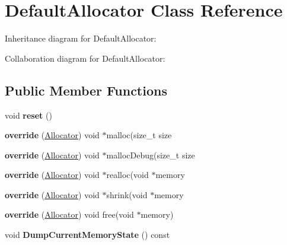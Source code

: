 \hypertarget{class_default_allocator}{\section{Default\+Allocator Class Reference}
\label{class_default_allocator}
}


Inheritance diagram for Default\+Allocator\+:


Collaboration diagram for Default\+Allocator\+:
\subsection*{Public Member Functions}
\begin{DoxyCompactItemize}
\item 
\hypertarget{class_default_allocator_a588bea0fe9129161898e48b458a69dfe}{void {\bfseries reset} ()}\label{class_default_allocator_a588bea0fe9129161898e48b458a69dfe}

\item 
\hypertarget{class_default_allocator_a11e467f040f50d08804f1a5e6b69fc2d}{{\bfseries override} (\hyperlink{class_allocator}{Allocator}) void $\ast$malloc(size\+\_\+t size}\label{class_default_allocator_a11e467f040f50d08804f1a5e6b69fc2d}

\item 
\hypertarget{class_default_allocator_aa2291a13d1cee13c256857d87f3fb77a}{{\bfseries override} (\hyperlink{class_allocator}{Allocator}) void $\ast$malloc\+Debug(size\+\_\+t size}\label{class_default_allocator_aa2291a13d1cee13c256857d87f3fb77a}

\item 
\hypertarget{class_default_allocator_af4b343b7ba035e046b4797815410385d}{{\bfseries override} (\hyperlink{class_allocator}{Allocator}) void $\ast$realloc(void $\ast$memory}\label{class_default_allocator_af4b343b7ba035e046b4797815410385d}

\item 
\hypertarget{class_default_allocator_a0e53be18460a7df3e770846f9e2e0daf}{{\bfseries override} (\hyperlink{class_allocator}{Allocator}) void $\ast$shrink(void $\ast$memory}\label{class_default_allocator_a0e53be18460a7df3e770846f9e2e0daf}

\item 
\hypertarget{class_default_allocator_a91e84f519f2f39a26903ecd22c03daf4}{{\bfseries override} (\hyperlink{class_allocator}{Allocator}) void free(void $\ast$memory)}\label{class_default_allocator_a91e84f519f2f39a26903ecd22c03daf4}

\item 
\hypertarget{class_default_allocator_a2ccf16043878a8748cd9be3b0522e6fc}{void {\bfseries Dump\+Current\+Memory\+State} () const }\label{class_default_allocator_a2ccf16043878a8748cd9be3b0522e6fc}

\end{DoxyCompactItemize}
